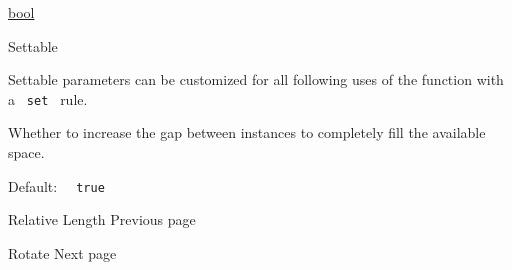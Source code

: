 \href{/docs/reference/foundations/bool/}{bool}

{{ Settable }}

\label{parameters-justify-settable-tooltip}
Settable parameters can be customized for all following uses of the
function with a \texttt{\ set\ } rule.

Whether to increase the gap between instances to completely fill the
available space.

Default: \texttt{\ }{\texttt{\ true\ }}\texttt{\ }

\href{/docs/reference/layout/relative/}{\pandocbounded{}}

{ Relative Length } { Previous page }

\href{/docs/reference/layout/rotate/}{\pandocbounded{}}

{ Rotate } { Next page }
